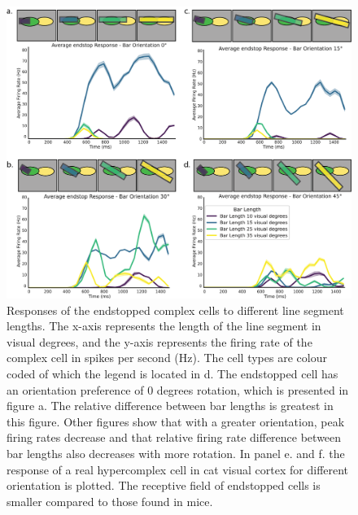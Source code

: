 \documentclass[12pt]{article}
\begin{document}
\begin{figure}[H]
    \centering
    \includegraphics[width=1.0 \textwidth]{./figures/LIF_endstopping_length_orientation.png}
    \caption{Responses of the endstopped complex cells to different line segment lengths. The x-axis represents the length of the line segment in visual degrees, and the y-axis represents the firing rate of the complex cell in spikes per second (Hz). The cell types are colour coded of which the legend is located in d. The endstopped cell has an orientation preference of 0 degrees rotation, which is presented in figure a. The relative difference between bar lengths is greatest in this figure. Other figures show that with a greater orientation, peak firing rates decrease and that relative firing rate difference between bar lengths also decreases with more rotation. In panel e. and f. the response of a real hypercomplex cell in cat visual cortex for different orientation is plotted. The receptive field of endstopped cells is smaller compared to those found in mice.}
    \label{fig:endstopping}
\end{figure}
\end{document}
